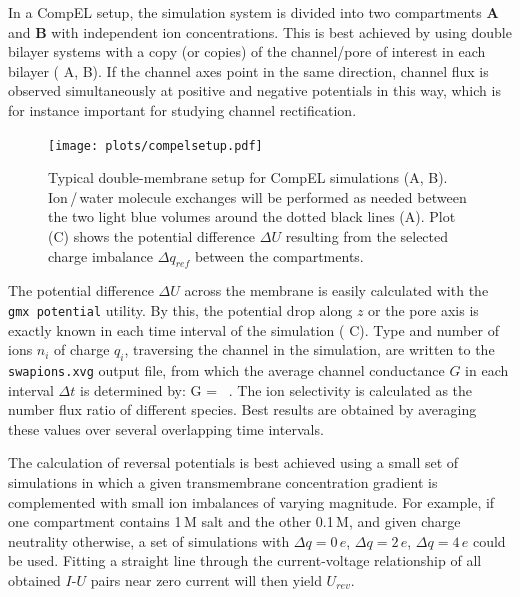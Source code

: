 In a CompEL setup, the simulation system is divided into two compartments {\bf A} and {\bf B}
with independent ion concentrations. This is best achieved by using double bilayer systems with
a copy (or copies) of the channel/pore of interest in each bilayer ( A, B).
If the channel axes point in the same direction, channel flux is observed
simultaneously at positive and negative potentials in this way, which is for instance
important for studying channel rectification.

\begin{figure}
\centerline{\texttt{[image: plots/compelsetup.pdf]}}
\caption{Typical double-membrane setup for CompEL simulations (A, B).
Ion\,/\,water molecule exchanges will be performed as needed
between the two light blue volumes around the dotted black lines (A).
Plot (C) shows the potential difference $\Delta U$ resulting
from the selected charge imbalance $\Delta q_{ref}$ between the compartments.}
\label{fig:compelsetup}
\end{figure}

The potential difference $\Delta U$ across the membrane is easily calculated with the
{\tt gmx potential} utility. By this, the potential drop along $z$ or the
pore axis is exactly known in each time interval of the simulation ( C).
Type and number of ions $n_i$ of charge $q_i$, traversing the channel in the simulation,
are written to the {\tt swapions.xvg} output file, from which the average channel
conductance $G$ in each interval $\Delta t$ is determined by:
\beq
G =  \, .
\eeq
The ion selectivity is calculated as the number flux ratio of different species.
Best results are obtained by averaging these values over several overlapping time intervals.

The calculation of reversal potentials is best achieved using a small set of simulations in which a given
transmembrane concentration gradient is complemented with small ion imbalances of varying magnitude. For
example, if one compartment contains 1\,M salt and the other 0.1\,M, and given charge neutrality otherwise,
a set of simulations with $\Delta q = 0\,e$, $\Delta q = 2\,e$, $\Delta q = 4\,e$ could
be used. Fitting a straight line through the current-voltage relationship of all obtained
$I$-$U$ pairs near zero current will then yield $U_{rev}$.

